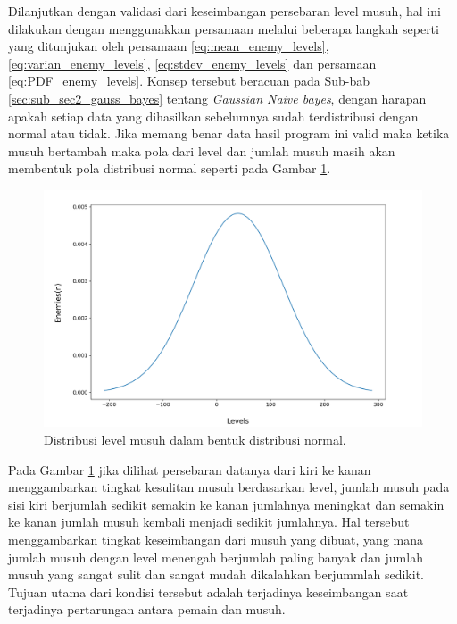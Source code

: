 Dilanjutkan dengan validasi dari keseimbangan persebaran level musuh, hal ini dilakukan dengan menggunakkan persamaan melalui beberapa langkah seperti yang ditunjukan oleh persamaan \ref{eq:mean_enemy_levels}, \ref{eq:varian_enemy_levels}, \ref{eq:stdev_enemy_levels} dan persamaan \ref{eq:PDF_enemy_levels}. Konsep tersebut beracuan pada Sub-bab \ref{sec:sub_sec2_gauss_bayes} tentang \textit{Gaussian Naive bayes}, dengan harapan apakah setiap data yang dihasilkan sebelumnya sudah terdistribusi dengan normal atau tidak. Jika memang benar data hasil program ini valid maka ketika musuh bertambah maka pola dari level dan jumlah musuh masih akan membentuk pola distribusi normal seperti pada Gambar \ref{fig:enemy_level_distrib_ndist}.

\begin{figure} [!h] \centering
	\includegraphics[scale=0.45]{img/EnemyLevelDistribNdist.png}
	\caption{Distribusi level musuh dalam bentuk distribusi normal.}
	\label{fig:enemy_level_distrib_ndist}
\end{figure}

Pada Gambar \ref{fig:enemy_level_distrib_ndist} jika dilihat persebaran datanya dari kiri ke kanan menggambarkan tingkat kesulitan musuh berdasarkan level, jumlah musuh pada sisi kiri berjumlah sedikit semakin ke kanan jumlahnya meningkat dan semakin ke kanan jumlah musuh kembali menjadi sedikit jumlahnya. Hal tersebut menggambarkan tingkat keseimbangan dari musuh yang dibuat, yang mana jumlah musuh dengan level menengah berjumlah paling banyak dan jumlah musuh yang sangat sulit dan sangat mudah dikalahkan berjummlah sedikit. Tujuan utama dari kondisi tersebut adalah terjadinya keseimbangan saat terjadinya pertarungan antara pemain dan musuh.
\vspace{1ex}


